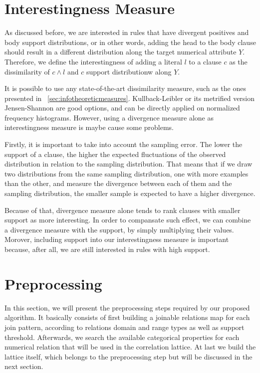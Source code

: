 \section{Interestingness Measure}

As discussed before, we are interested in rules that have divergent positives and body support distributions, or in
other words, adding the head to the body clause should result in a different distribution along the target numerical
attribute $Y$. Therefore, we define the interestingness of adding a literal $l$ to a clause $c$ as the
dissimilarity of $c \wedge l$ and $c$ support distributionw along $Y$.

It is possible to use any state-of-the-art dissimilarity measure, such as the ones presented
in ~\ref{sec:infotheoreticmeasures}. Kullback-Leibler or its metrified version Jensen-Shannon are good options, and
can be directly applied on normalized frequency histograms. However, using a divergence
measure alone as interestingness measure is maybe cause some problems.

Firstly, it is important to take into account the sampling error. The lower the support of a clause, the higher the
expected fluctuations of the observed distribution in relation to the sampling distribution. That means that if we
draw two distributions from the same sampling distribution, one with more examples than the other, and measure the
divergence between each of them and the sampling distribution, the smaller sample is expected to have a higher
divergence.

Because of that, divergence measure alone tends to rank clauses with smaller support as more interesting. In order to
compansate such effect, we can combine a divergence measure with the support, by simply multiplying their values.
Morover, including support into our interestingness measure is important because, after all, we are still interested
in rules with high support.

\section{Preprocessing}

In this section, we will present the preprocessing steps required by our proposed algorithm. It basically consists of
first building a joinable relations map for each join pattern, according
to relations domain and range types as well as support threshold. Afterwards, we search the available categorical
properties for each numerical relation that will be used in the correlation lattice. At last we build the lattice
itself, which belongs to the preprocessing step but will be discussed in the next section.

